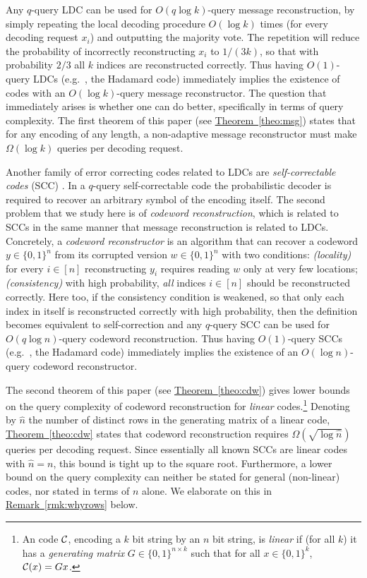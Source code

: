 \documentclass[10pt]{article}
\theoremstyle{definition}
\providecommand{\eg}{e.g.\ }
\numberwithin{equation}{section}
\newcommand{\expref}[2]{\texorpdfstring{\hyperref[#2]{#1~\ref{#2}}}{#1~\ref{#2}}}
\newcommand{\CC}{{\cal C}}
\newcommand{\zo}{{\{0,1\}}}
\begin{document}
Any $q$-query LDC can be used for $O(q \log k)$-query message reconstruction, by simply repeating the local decoding procedure
$O(\log k)$ times (for every decoding request $x_i$) and outputting the majority vote. The repetition will reduce the  probability of incorrectly reconstructing $x_i$ to $1/(3k)$, so that with probability  $2/3$ all $k$ indices are reconstructed correctly. Thus having $O(1)$-query LDCs (\eg, the Hadamard code) immediately implies the existence of codes with an $O(\log k)$-query message reconstructor. The question that immediately arises is whether one can do better, specifically in terms of query complexity. The first theorem of this paper (see \expref{Theorem}{theo:msg}) states that for any encoding of any length, a non-adaptive message reconstructor must make $\Omega( \log k)$ queries per decoding request.

Another family of error correcting codes related to LDCs are 
%
\emph{self-correctable codes} 
(SCC) \cite{blr}. In a $q$-query self-correctable
code the probabilistic decoder is required to recover an arbitrary symbol of the
encoding itself.
The second problem that we study here is of \emph{codeword reconstruction}, which is related to SCCs in the same manner that message reconstruction is related to LDCs.
Concretely, a \emph{codeword reconstructor} is an algorithm that can recover a codeword $y\in \zo^n$ from its corrupted version $w \in \zo^n$ with two conditions:
\emph{(locality)} for every $i \in [n]$ reconstructing $y_i$ requires reading $w$ only at very few locations;
\emph{(consistency)} with high probability, \emph{all} indices $i \in [n]$ should be reconstructed correctly.
Here too, if the consistency condition is weakened, so that only each index in itself
is reconstructed correctly with high probability, then the
definition becomes equivalent to 
%
self-correction
and any $q$-query SCC can be used for $O(q \log n)$-query codeword reconstruction. Thus having $O(1)$-query SCCs (\eg, the Hadamard code) immediately implies the existence of an $O(\log n)$-query codeword reconstructor.

The second theorem of this paper (see \expref{Theorem}{theo:cdw}) gives lower bounds on the query complexity of codeword reconstruction for \emph{linear} codes.\footnote{An code $\CC$, encoding a $k$ bit string by an $n$ bit string,  is \emph{linear} if (for all $k$) it has a \emph{generating matrix} $G \in \zo^{n \times k}$ such that for all $x \in \zo^k$, $\CC(x) = Gx$.} Denoting by $\hat{n}$ the number of distinct rows in the generating matrix of a linear code, \expref{Theorem}{theo:cdw} states that codeword reconstruction requires $\Omega(\sqrt{ \log \hat{n}})$ queries per decoding request.
Since essentially all known SCCs are linear codes with $\hat{n}=n$, this bound is tight up to the square root. Furthermore, a lower bound on the query complexity can neither be stated for general (non-linear) codes, nor stated in terms of $n$ alone. We elaborate on this in \expref{Remark}{rmk:whyrows} below.
\end{document}
